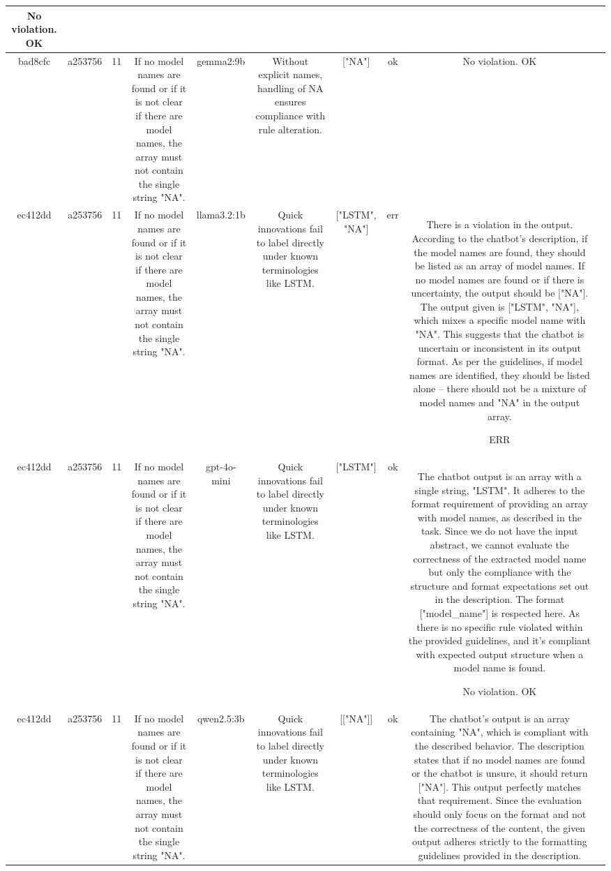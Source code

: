 \begin{table}[h!]
\begin{tabular}{|c|c|c|c|c|c|c|c|c|c|}
No violation.
OK & \\
\hline
bad8cfc & a253756 & 11 & If no model names are found or if it is not clear if there are model names, the array must not contain the single string "NA". & gemma2:9b & Without explicit names, handling of NA ensures compliance with rule alteration. & ["NA"] 
 & ok & No violation. 
OK & \\
\hline
ec412dd & a253756 & 11 & If no model names are found or if it is not clear if there are model names, the array must not contain the single string "NA". & llama3.2:1b & Quick innovations fail to label directly under known terminologies like LSTM. & ["LSTM", "NA"] & err & There is a violation in the output. According to the chatbot's description, if the model names are found, they should be listed as an array of model names. If no model names are found or if there is uncertainty, the output should be ["NA"]. The output given is ["LSTM", "NA"], which mixes a specific model name with "NA". This suggests that the chatbot is uncertain or inconsistent in its output format. As per the guidelines, if model names are identified, they should be listed alone – there should not be a mixture of model names and "NA" in the output array.

ERR & \\
\hline
ec412dd & a253756 & 11 & If no model names are found or if it is not clear if there are model names, the array must not contain the single string "NA". & gpt-4o-mini & Quick innovations fail to label directly under known terminologies like LSTM. & ["LSTM"] & ok & The chatbot output is an array with a single string, "LSTM". It adheres to the format requirement of providing an array with model names, as described in the task. Since we do not have the input abstract, we cannot evaluate the correctness of the extracted model name but only the compliance with the structure and format expectations set out in the description. The format ["model_name"] is respected here. As there is no specific rule violated within the provided guidelines, and it's compliant with expected output structure when a model name is found.

No violation.
OK & \\
\hline
ec412dd & a253756 & 11 & If no model names are found or if it is not clear if there are model names, the array must not contain the single string "NA". & qwen2.5:3b & Quick innovations fail to label directly under known terminologies like LSTM. & [["NA"]] & ok & The chatbot's output is an array containing "NA", which is compliant with the described behavior. The description states that if no model names are found or the chatbot is unsure, it should return ["NA"]. This output perfectly matches that requirement. Since the evaluation should only focus on the format and not the correctness of the content, the given output adheres strictly to the formatting guidelines provided in the description.


\end{tabular}
\end{table}
